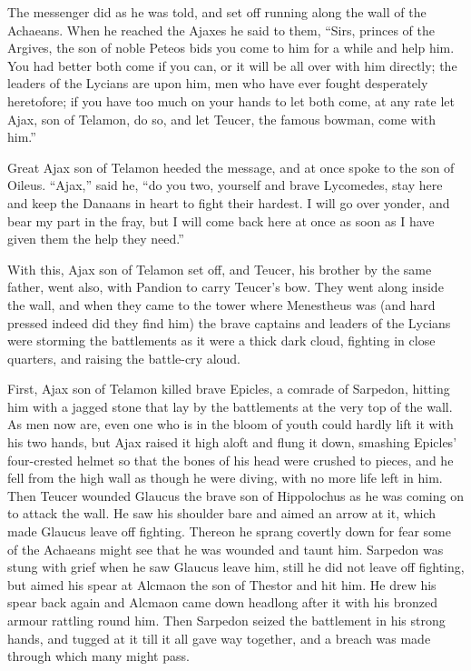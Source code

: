 The messenger did as he was told, and set off running along the wall of
the Achaeans. When he reached the Ajaxes he said to them, “Sirs, princes
of the Argives, the son of noble Peteos bids you come to him for a while
and help him. You had better both come if you can, or it will be all over
with him directly; the leaders of the Lycians are upon him, men who have
ever fought desperately heretofore; if you have too much on your hands to
let both come, at any rate let Ajax, son of Telamon, do so, and let
Teucer, the famous bowman, come with him.”

Great Ajax son of Telamon heeded the message, and at once spoke to the son
of Oileus. “Ajax,” said he, “do you two, yourself and brave Lycomedes,
stay here and keep the Danaans in heart to fight their hardest. I will go
over yonder, and bear my part in the fray, but I will come back here at
once as soon as I have given them the help they need.”

With this, Ajax son of Telamon set off, and Teucer, his brother by the
same father, went also, with Pandion to carry Teucer’s bow. They went
along inside the wall, and when they came to the tower where Menestheus
was (and hard pressed indeed did they find him) the brave captains and
leaders of the Lycians were storming the battlements as it were a thick
dark cloud, fighting in close quarters, and raising the battle-cry aloud.

First, Ajax son of Telamon killed brave Epicles, a comrade of Sarpedon,
hitting him with a jagged stone that lay by the battlements at the very
top of the wall. As men now are, even one who is in the bloom of youth
could hardly lift it with his two hands, but Ajax raised it high aloft and
flung it down, smashing Epicles’ four-crested helmet so that the bones of
his head were crushed to pieces, and he fell from the high wall as though
he were diving, with no more life left in him. Then Teucer wounded Glaucus
the brave son of Hippolochus as he was coming on to attack the wall. He
saw his shoulder bare and aimed an arrow at it, which made Glaucus leave
off fighting. Thereon he sprang covertly down for fear some of the
Achaeans might see that he was wounded and taunt him. Sarpedon was stung
with grief when he saw Glaucus leave him, still he did not leave off
fighting, but aimed his spear at Alcmaon the son of Thestor and hit him.
He drew his spear back again and Alcmaon came down headlong after it with
his bronzed armour rattling round him. Then Sarpedon seized the battlement
in his strong hands, and tugged at it till it all gave way together, and a
breach was made through which many might pass.

